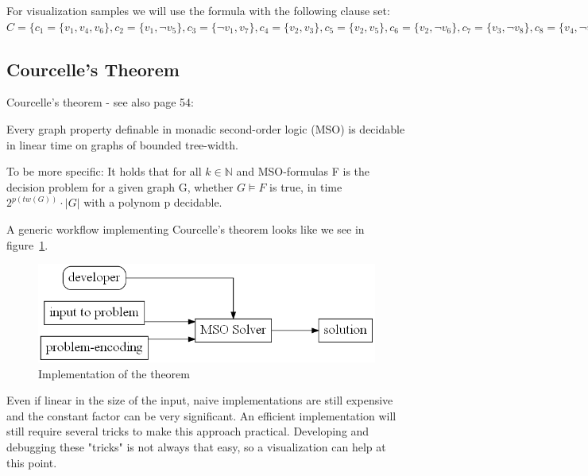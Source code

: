 \documentclass[a4paper, 12pt, bibliography=totoc]{scrartcl}
\begin{document}
\begin{example}\label{ex:example41}
	For visualization samples we will use the formula with the following clause set: $C=\{c_{1}=\{v_{1},v_{4},v_{6}\},
	c_{2}=\{v_{1},\neg v_{5}\},
	c_{3}=\{\neg v_{1},v_{7}\},
	c_{4}=\{v_{2},v_{3}\},
	c_{5}=\{v_{2},v_{5}\},
	c_{6}=\{v_{2},\neg v_{6}\},
	c_{7}=\{v_{3},\neg v_{8}\},
	c_{8}=\{v_{4},\neg v_{8}\},
	c_{9}=\{\neg v_{4},v_{6}\},
	c_{10}=\{\neg v_{4},v_{7}\}\}$
\end{example}

\subsection{Courcelle's Theorem}
Courcelle's theorem - see also \cite{Courcelle2012} page 54:
\begin{thm}
	Every graph property definable in monadic second-order logic (MSO) is decidable in linear time on graphs of bounded tree-width. 
\end{thm}

\noindent
To be more specific: It holds that for all $k \in \mathbb{N}$ and MSO-formulas F is the decision problem for a given graph G, whether $G \models F$ is true, in time $2^{p(tw(G))} \cdot |G|$ with a polynom p decidable.\smallskip 

\noindent
A generic workflow implementing Courcelle's theorem looks like we see in figure~\ref{fig:UsageCourcelle}.
\begin{figure}[H]
	\includegraphics[height=0.2\textheight]{images/UsageCourcelle.gv.png}
	\caption{Implementation of the theorem}
	\label{fig:UsageCourcelle}
\end{figure}

Even if linear in the size of the input, naive implementations are still expensive and 
the constant factor can be very significant. An efficient implementation will still require several tricks to make this approach practical. Developing and debugging these "tricks" is not always that easy, so a visualization can help at this point.\smallskip 
\end{document}
